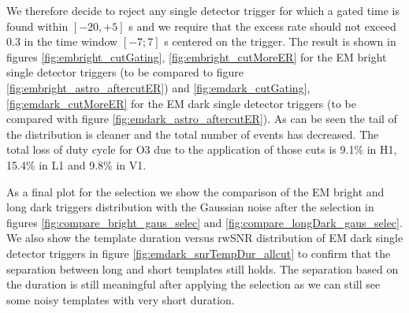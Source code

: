 We therefore decide to reject any single detector trigger for which a gated time is found within $[-20,+5]$ \si{s} and we require that the excess rate should not exceed 0.3 in the time window $[-7;7]$ \si{s} centered on the trigger. The result is shown in figures \ref{fig:embright_cutGating}, \ref{fig:embright_cutMoreER} for the EM bright single detector triggers (to be compared to figure \ref{fig:embright_astro_aftercutER}) and \ref{fig:emdark_cutGating}, \ref{fig:emdark_cutMoreER} for the EM dark single detector triggers (to be compared with figure \ref{fig:emdark_astro_aftercutER}).
As can be seen the tail of the distribution is cleaner and the total number of events has decreased.
The total loss of duty cycle for O3 due to the application of those cuts is 9.1\% in H1, 15.4\% in L1 and 9.8\% in V1.

As a final plot for the selection we show the comparison of the EM bright and long dark triggers distribution with the Gaussian noise after the selection in figures \ref{fig:compare_bright_gaus_selec} and \ref{fig:compare_longDark_gaus_selec}.
We also show the template duration versus rwSNR distribution of EM dark single detector triggers in figure \ref{fig:emdark_snrTempDur_allcut} to confirm that the separation between long and short templates still holds.
The separation based on the duration is still meaningful after applying the selection as we can still see some noisy templates with very short duration.

